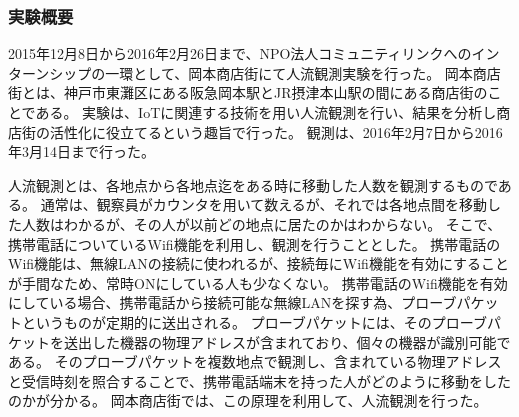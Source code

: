 \subsubsection{実験概要}
2015年12月8日から2016年2月26日まで、NPO法人コミュニティリンクへのインターンシップの一環として、岡本商店街にて人流観測実験を行った。
岡本商店街とは、神戸市東灘区にある阪急岡本駅とJR摂津本山駅の間にある商店街のことである。
実験は、IoTに関連する技術を用い人流観測を行い、結果を分析し商店街の活性化に役立てるという趣旨で行った。
観測は、2016年2月7日から2016年3月14日まで行った。

人流観測とは、各地点から各地点迄をある時に移動した人数を観測するものである。
通常は、観察員がカウンタを用いて数えるが、それでは各地点間を移動した人数はわかるが、その人が以前どの地点に居たのかはわからない。
そこで、携帯電話についているWifi機能を利用し、観測を行うこととした。
携帯電話のWifi機能は、無線LANの接続に使われるが、接続毎にWifi機能を有効にすることが手間なため、常時ONにしている人も少なくない。
携帯電話のWifi機能を有効にしている場合、携帯電話から接続可能な無線LANを探す為、プローブパケットというものが定期的に送出される。
プローブパケットには、そのプローブパケットを送出した機器の物理アドレスが含まれており、個々の機器が識別可能である。
そのプローブパケットを複数地点で観測し、含まれている物理アドレスと受信時刻を照合することで、携帯電話端末を持った人がどのように移動をしたのかが分かる。
岡本商店街では、この原理を利用して、人流観測を行った。

